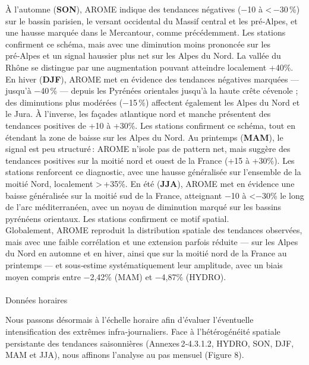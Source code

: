 \documentclass[
  article,
  nofooter,
  noheadings]{jss}
\makeatletter
\let\oldparagraph\paragraph
\renewcommand{\paragraph}{
    \@ifstar
      \xxxParagraphStar
      \xxxParagraphNoStar
  }
\newcommand{\xxxParagraphStar}[1]{\oldparagraph*{#1}\mbox{}}
\newcommand{\xxxParagraphNoStar}[1]{\oldparagraph{#1}\mbox{}}
\makeatother
\begin{document}
\hfill\break

À l'automne (\textbf{SON}), AROME indique des tendances négatives (−10 à
\textless\,−30\,\%) sur le bassin parisien, le versant occidental du
Massif central et les pré‑Alpes, et une hausse marquée dans le
Mercantour, comme précédemment. Les stations confirment ce schéma, mais
avec une diminution moins prononcée sur les pré‑Alpes et un signal
haussier plus net sur les Alpes du Nord. La vallée du Rhône se distingue
par une augmentation pouvant atteindre localement +40\%. En hiver
(\textbf{DJF}), AROME met en évidence des tendances négatives marquées
--- jusqu'à −40\,\% --- depuis les Pyrénées orientales jusqu'à la haute
crête cévenole ; des diminutions plus modérées (−15\,\%) affectent
également les Alpes du Nord et le Jura. À l'inverse, les façades
atlantique nord et manche présentent des tendances positives de +10 à
+30\%. Les stations confirment ce schéma, tout en étendant la zone de
baisse sur les Alpes du Nord. Au printemps (\textbf{MAM}), le signal est
peu structuré\,: AROME n'isole pas de pattern net, mais suggère des
tendances positives sur la moitié nord et ouest de la France (+15 à
+30\%). Les stations renforcent ce diagnostic, avec une hausse
généralisée sur l'ensemble de la moitié Nord, localement
\textgreater\,+35\%. En été (\textbf{JJA}), AROME met en évidence une
baisse généralisée sur la moitié sud de la France, atteignant −10 à
\textless−30\% le long de l'arc méditerranéen, avec un noyau de
diminution marqué sur les bassins pyrénéens orientaux. Les stations
confirment ce motif spatial.\\

Globalement, AROME reproduit la distribution spatiale des tendances
observées, mais avec une faible corrélation et une extension parfois
réduite --- sur les Alpes du Nord en automne et en hiver, ainsi que sur
la moitié nord de la France au printemps --- et sous‑estime
systématiquement leur amplitude, avec un biais moyen compris entre
−2,42\% (MAM) et −4,87\% (HYDRO).

\paragraph{Données horaires}\label{donnuxe9es-horaires}

Nous passons désormais à l'échelle horaire afin d'évaluer l'éventuelle
intensification des extrêmes infra‑journaliers. Face à l'hétérogénéité
spatiale persistante des tendances saisonnières (Annexes\,2‑4.3.1.2,
HYDRO, SON, DJF, MAM et JJA), nous affinons l'analyse au pas mensuel
(Figure 8).
\end{document}
